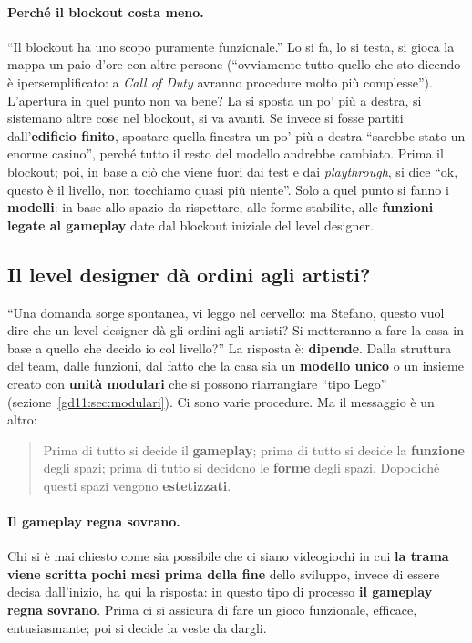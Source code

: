 \paragraph{Perché il blockout costa meno.} ``Il blockout ha uno scopo
puramente funzionale.'' Lo si fa, lo si testa, si gioca la mappa un paio d'ore
con altre persone (``ovviamente tutto quello che sto dicendo è
ipersemplificato: a \emph{Call of Duty} avranno procedure molto più complesse'').
L'apertura in quel punto non va bene? La si sposta un po' più a destra, si
sistemano altre cose nel blockout, si va avanti. Se invece si fosse partiti
dall'\textbf{edificio finito}, spostare quella finestra un po' più a destra
``sarebbe stato un enorme casino'', perché tutto il resto del modello andrebbe
cambiato. Prima il blockout; poi, in base a ciò che viene fuori dai test e dai
\emph{playthrough}, si dice ``ok, questo è il livello, non tocchiamo quasi più
niente''. Solo a quel punto si fanno i \textbf{modelli}: in base allo spazio da
rispettare, alle forme stabilite, alle \textbf{funzioni legate al gameplay}
date dal blockout iniziale del level designer.

\subsection{Il level designer dà ordini agli artisti?}

``Una domanda sorge spontanea, vi leggo nel cervello: ma Stefano, questo vuol
dire che un level designer dà gli ordini agli artisti? Si metteranno a fare la
casa in base a quello che decido io col livello?'' La risposta è: \textbf{dipende}.
Dalla struttura del team, dalle funzioni, dal fatto che la casa sia un
\textbf{modello unico} o un insieme creato con \textbf{unità modulari} che si
possono riarrangiare ``tipo Lego'' (sezione~\ref{gd11:sec:modulari}). Ci sono
varie procedure. Ma il messaggio è un altro:
\begin{quote}
Prima di tutto si decide il \textbf{gameplay}; prima di tutto si decide la
\textbf{funzione} degli spazi; prima di tutto si decidono le \textbf{forme}
degli spazi. Dopodiché questi spazi vengono \textbf{estetizzati}.
\end{quote}

\paragraph{Il gameplay regna sovrano.} Chi si è mai chiesto come sia possibile
che ci siano videogiochi in cui \textbf{la trama viene scritta pochi mesi prima
della fine} dello sviluppo, invece di essere decisa dall'inizio, ha qui la
risposta: in questo tipo di processo \textbf{il gameplay regna sovrano}. Prima
ci si assicura di fare un gioco funzionale, efficace, entusiasmante; poi si
decide la veste da dargli.

